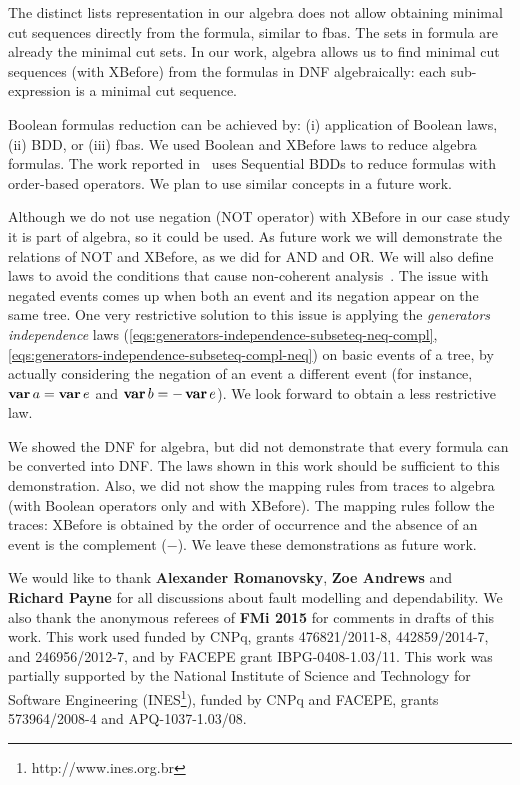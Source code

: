 \documentclass[en,twoside,onehalfspacing,phd]{risethesis}
\def\varop{\ensuremath\operatorname{\mathbf{var}}}
\newcommand{\var}[1]{\ensuremath\varop #1}
\begin{document}
The distinct lists representation in our algebra does not allow obtaining minimal cut sequences directly from the formula, similar to \acp{fba}.
The sets in  formula are already the minimal cut sets.
In our work, \ac{algebra} allows us to find minimal cut sequences (with XBefore) from the formulas in DNF algebraically: each sub-expression is a minimal cut sequence.

Boolean formulas reduction can be achieved by: (i) application of Boolean laws, (ii) \ac{BDD}, or (iii) \acp{fba}.
We used Boolean and XBefore laws to reduce \ac{algebra} formulas.
%
The work reported in~\cite{TXD2011,XTD2012} uses Sequential BDDs to reduce formulas with order-based operators.
%
We plan to use similar concepts in a future work.

Although we do not use negation (NOT operator) with XBefore in our case study it is part of \ac{algebra}, so it could be used.
As future work we will demonstrate the relations of NOT and XBefore, as we did for AND and OR.
We will also define laws to avoid the conditions that cause non-coherent analysis~\cite{Oliv2006}.
The issue with negated events comes up when both an event and its negation appear on the same tree.
One very restrictive solution to this issue is applying the \emph{generators independence} laws (\ref{eqs:generators-independence-subseteq-neq-compl}, \ref{eqs:generators-independence-subseteq-compl-neq}) on basic events of a tree, by actually considering the negation of an event a different event (for instance, $\var a= \var e$ and $\var b=-\var e$).
We look forward to obtain a less restrictive law.


We showed the DNF for \ac{algebra}, but did not demonstrate that every formula can be converted into DNF.
The laws shown in this work should be sufficient to this demonstration.
Also, we did not show the mapping rules from traces to \ac{algebra} (with Boolean operators only and with XBefore).
The mapping rules follow the traces: XBefore is obtained by the order of occurrence and the absence of an event is the complement ($-$).
We leave these demonstrations as future work.


\begin{sloppypar}
\begin{acknowledgements}
We would like to thank \textbf{Alexander Romanovsky}, \textbf{Zoe Andrews} and \textbf{Richard Payne} for all discussions about fault modelling and dependability.
%
We also thank the anonymous referees of \textbf{FMi 2015}
for comments in drafts of this work.
%
This work used funded by CNPq, grants 476821/2011-8, 442859/2014-7, and 246956/2012-7, and
%
by FACEPE grant IBPG-0408-1.03/11. 
%
This work was partially supported by the National Institute of Science and Technology for Software Engineering (INES\footnote{http://www.ines.org.br}), funded by CNPq and FACEPE, grants 573964/2008-4 and APQ-1037-1.03/08.
\end{acknowledgements}
\end{sloppypar}
\end{document}
